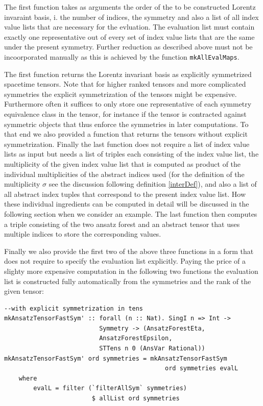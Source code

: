 \documentclass[a4paper,12pt, DIV=14, BCOR=5mm, twoside, headsepline]{scrbook}
\begin{document}
The first function takes as arguments the order of the to be constructed Lorentz invaraint basis, i. the number of indices, the symmetry and also a list of all index value lists that are necessary for the evluation. The evaluation list must contain exactly one representative out of every set of index value lists that are the same under the present symmetry. Further reduction as described above must not be incoorporated manually as this is achieved by the function \texttt{mkAllEvalMaps}.

The first function returns the Lorentz invariant basis as explicitly symmetrized spacetime tensors. Note that for higher ranked tensors and more complicated symmetries the explicit symmetrization of the tensors might be expensive. Furthermore often it suffices to only store one representative of each symmetry equivalence class in the tensor, for instance if the tensor is contracted against symmetric objects that thus enforce the symmetries in later computations. To that end we also provided a function that returns the tensors without explicit symmetrization. Finally the last function does not require a list of index value lists as input but needs a list of triples each consisting of the index value list, the multiplicity of the given index value list that is computed as product of the individual multiplicities of the abstract indices used (for the definition of the multiplicity $\sigma$ see the discussion following definition \ref{interDef}), and also a list of all abstract index tuples that correspond to the present index value list. How these individual ingredients can be computed in detail will be discussed in the following section when we consider an example. The last function then computes a triple consisting of the two ansatz forest and an abstract tensor that uses multiple indices to store the corresponding values. 

Finally we also provide the first two of the above three functions in a form that does not require to specify the evaluation list explicitly. Paying the price of a slighty more expensive computation in the following two functions the evaluation list is constructed fully automatically from the symmetries and the rank of the given tensor: 

\begin{samepage}
\begin{verbatim}
--with explicit symmetrization in tens
mkAnsatzTensorFastSym' :: forall (n :: Nat). SingI n => Int ->
                          Symmetry -> (AnsatzForestEta,
                          AnsatzForestEpsilon,
                          STTens n 0 (AnsVar Rational))
mkAnsatzTensorFastSym' ord symmetries = mkAnsatzTensorFastSym
                                            ord symmetries evalL
    where
        evalL = filter (`filterAllSym` symmetries) 
                        $ allList ord symmetries
\end{verbatim} 
\end{samepage}
\end{document}
